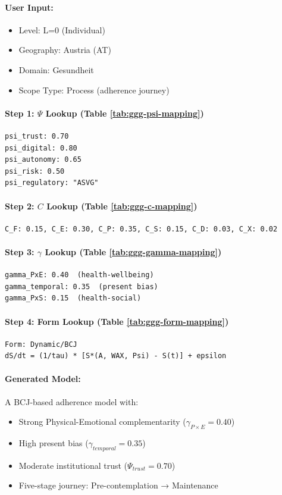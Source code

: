 \paragraph{User Input:}
\begin{itemize}
\item Level: L=0 (Individual)
\item Geography: Austria (AT)
\item Domain: Gesundheit
\item Scope Type: Process (adherence journey)
\end{itemize}

\paragraph{Step 1: $\Psi$ Lookup (Table \ref{tab:ggg-psi-mapping})}
\begin{verbatim}
psi_trust: 0.70
psi_digital: 0.80
psi_autonomy: 0.65
psi_risk: 0.50
psi_regulatory: "ASVG"
\end{verbatim}

\paragraph{Step 2: $C$ Lookup (Table \ref{tab:ggg-c-mapping})}
\begin{verbatim}
C_F: 0.15, C_E: 0.30, C_P: 0.35, C_S: 0.15, C_D: 0.03, C_X: 0.02
\end{verbatim}

\paragraph{Step 3: $\gamma$ Lookup (Table \ref{tab:ggg-gamma-mapping})}
\begin{verbatim}
gamma_PxE: 0.40  (health-wellbeing)
gamma_temporal: 0.35  (present bias)
gamma_PxS: 0.15  (health-social)
\end{verbatim}

\paragraph{Step 4: Form Lookup (Table \ref{tab:ggg-form-mapping})}
\begin{verbatim}
Form: Dynamic/BCJ
dS/dt = (1/tau) * [S*(A, WAX, Psi) - S(t)] + epsilon
\end{verbatim}

\paragraph{Generated Model:}
A BCJ-based adherence model with:
\begin{itemize}
\item Strong Physical-Emotional complementarity ($\gamma_{P \times E} = 0.40$)
\item High present bias ($\gamma_{temporal} = 0.35$)
\item Moderate institutional trust ($\Psi_{trust} = 0.70$)
\item Five-stage journey: Pre-contemplation → Maintenance
\end{itemize}


